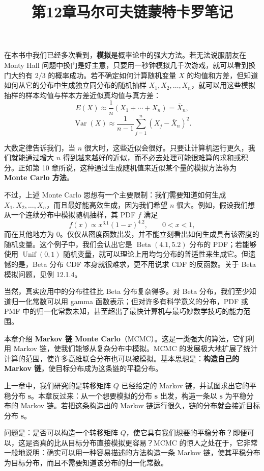 \documentclass[UTF8,12pt,a4paper,fontset=fandol]{ctexart}
\title{第12章\quad 马尔可夫链蒙特卡罗笔记}
\author{}
\date{}
\begin{document}
\maketitle

在本书中我们已经多次看到，\textbf{模拟}是概率论中的强大方法。若无法说服朋友在 Monty Hall 问题中换门是好主意，只要用一秒钟模拟几千次游戏，就可以看到换门大约有 $2/3$ 的概率成功。若不确定如何计算随机变量 $X$ 的均值和方差，但知道如何从它的分布中生成独立同分布的随机抽样 $X_1,X_2,\ldots,X_n$，就可以用这些模拟抽样的样本均值与样本方差近似真均值与真方差：
\[
  E(X)\approx \frac1n(X_1+\cdots+X_n)=\bar X_n,
\]
\[
  \operatorname{Var}(X)\approx
  \frac{1}{n-1}\sum_{j=1}^{n}(X_j-\bar X_n)^2.
\]

大数定律告诉我们，当 $n$ 很大时，这些近似会很好。只要让计算机运行更久，我们就能通过增大 $n$ 得到越来越好的近似，而不必去处理可能很难算的求和或积分。正如第 10 章所说，这种通过生成随机值来近似某个量的模拟方法称为 \textbf{Monte Carlo 方法}。

不过，上述 Monte Carlo 思想有一个主要限制：我们需要知道如何生成 $X_1,X_2,\ldots,X_n$，而且最好能高效生成，因为我们希望 $n$ 很大。例如，假设我们想从一个连续分布中模拟随机抽样，其 PDF $f$ 满足
\[
  f(x)\propto x^{3.1}(1-x)^{4.2},\qquad 0<x<1,
\]
而在其他地方为 $0$。仅仅从密度函数出发，并不能立刻看出如何生成具有该密度的随机变量。这个例子中，我们会认出它是 $\operatorname{Beta}(4.1,5.2)$ 分布的 PDF；若能够使用 $\operatorname{Unif}(0,1)$ 随机变量，就可以理论上用均匀分布的普适性来生成它。但遗憾的是，Beta 分布 CDF 本身就很难求，更不用说求 CDF 的反函数。关于 Beta 模拟问题，见例 12.1.4。

当然，真实应用中的分布往往比 Beta 分布复杂得多。对 Beta 分布，我们至少知道归一化常数可以用 gamma 函数表示；但对许多有科学意义的分布，PDF 或 PMF 中的归一化常数未知，甚至超出了最快计算机与最巧妙数学技巧的能力范围。

本章介绍 \textbf{Markov 链 Monte Carlo}（MCMC）。这是一类强大的算法，它们利用 Markov 链，使我们能够从复杂分布中模拟。MCMC 的发展极大地扩展了统计计算的范围，使许多高维联合分布也可以被模拟。基本思想是：\textbf{构造自己的 Markov 链}，使目标分布成为这条链的平稳分布。

上一章中，我们研究的是转移矩阵 $Q$ 已经给定的 Markov 链，并试图求出它的平稳分布 $\mathbf s$。本章反过来：从一个想要模拟的分布 $\mathbf s$ 出发，构造一条以 $\mathbf s$ 为平稳分布的 Markov 链。若把这条构造出的 Markov 链运行很久，链的分布就会接近目标分布 $\mathbf s$。

问题是：是否可以构造一个转移矩阵 $Q$，使它具有我们想要的平稳分布？即便可以，这是否真的比从目标分布直接模拟更容易？MCMC 的惊人之处在于，它非常一般地说明：确实可以用一种容易描述的方法构造一条 Markov 链，使其平稳分布为目标分布，而且不需要知道该分布的归一化常数。
\end{document}
